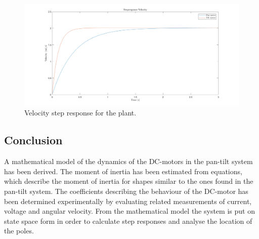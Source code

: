 \documentclass[../../main.tex]{subfiles}
\begin{document}
\begin{figure}
    \centering
    \includegraphics[width = 0.9 \textwidth]{Sections/System_Modelling/Images/stepResponseVelPlant.png}
    \caption{Velocity step response for the plant.}
    \label{fig:StepVelPlant}
\end{figure}



\subsection{Conclusion}

A mathematical model of the dynamics of the DC-motors in the pan-tilt system has been derived. The moment of inertia has been estimated from equations, which describe the moment of inertia for shapes similar to the ones found in the pan-tilt system. The coefficients describing the behaviour of the DC-motor has been determined experimentally by evaluating related measurements of current, voltage and angular velocity. From the mathematical model the system is put on state space form in order to calculate step responses and analyse the location of the poles.
\end{document}
